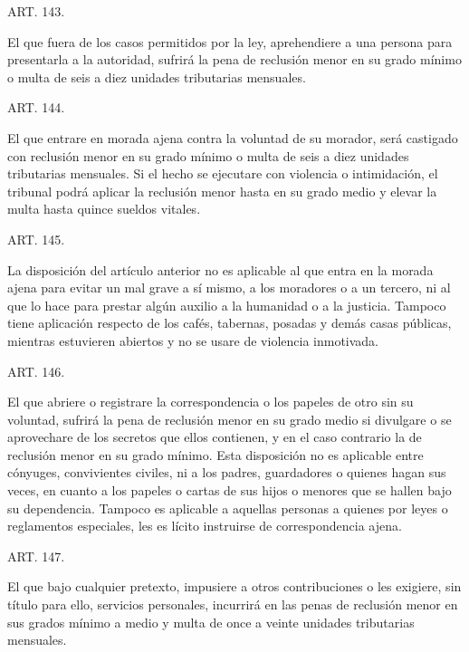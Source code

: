     ART. 143.

    El que fuera de los casos permitidos por la ley, aprehendiere a una persona para presentarla a la autoridad, sufrirá la pena de reclusión menor en su grado mínimo o multa de seis a diez unidades tributarias mensuales.






    ART. 144.

    El que entrare en morada ajena contra la voluntad de su morador, será castigado con reclusión menor en su grado mínimo o multa de seis a diez unidades tributarias mensuales.
    Si el hecho se ejecutare con violencia o intimidación, el tribunal podrá aplicar la reclusión menor hasta en su grado medio y elevar la multa hasta quince sueldos vitales.




    ART. 145.

    La disposición del artículo anterior no es aplicable al que entra en la morada ajena para evitar un mal grave a sí mismo, a los moradores o a un tercero, ni al que lo hace para prestar algún auxilio a la humanidad o a la justicia.
    Tampoco tiene aplicación respecto de los cafés, tabernas, posadas y demás casas públicas, mientras estuvieren abiertos y no se usare de violencia inmotivada.


    ART. 146.

    El que abriere o registrare la correspondencia o los papeles de otro sin su voluntad, sufrirá la pena de reclusión menor en su grado medio si divulgare o se aprovechare de los secretos que ellos contienen, y en el caso contrario la de reclusión menor en su grado mínimo.
    Esta disposición no es aplicable entre cónyuges, convivientes civiles, ni a los padres, guardadores o quienes hagan sus veces, en cuanto a los papeles o cartas de sus hijos o menores que se hallen bajo su dependencia.
    Tampoco es aplicable a aquellas personas a quienes por leyes o reglamentos especiales, les es lícito instruirse de correspondencia ajena.




    ART. 147.

    El que bajo cualquier pretexto, impusiere a otros contribuciones o les exigiere, sin título para ello, servicios personales, incurrirá en las penas de reclusión menor en sus grados mínimo a medio y multa de once a veinte unidades tributarias mensuales.







